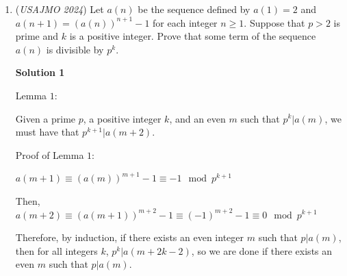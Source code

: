 \begin{enumerate}
            \begin{enumerate}[label=(\roman*)]
                \item 2. Else, if it is \textit{not} vertically symmetric, it makes a pair with its vertical reflection.
            \end{enumerate}
            
            \begin{enumerate}[label=(\roman*)]
                \item 3. Else, if it is \textit{not} half-symmetric, we can similarly make a pair with its horizontal or vertical half-reflection.
            \end{enumerate}
            The \textbf{half-reflection} is defined by reflecting only the edge of each rectangle closest to the horizontal/vertical center, while keeping the other edge fixed. For example, a vertical half-reflection would send the rectangle
 \[\{(0, 0), (1, 0), (1, n-1), (0, n-1)\}\]to
 \[\{(0, 0), (1, 0), (1, n+1), (0, n+1)\}.\]Since every configuration that is not symmetric or half-symmetric comes in pairs, we only need to look at the parity of the configurations that are both symmetric and half-symmetric. But, being symmetric and half-symmetric uniquely determines a rectangle if we know a single vertex, so there is only one such configuration.

 


	\item (\textit{USAJMO 2024}) Let $a(n)$ be the sequence defined by $a(1)=2$ and $a(n+1)=(a(n))^{n+1}-1$ for each integer $n\geq1$. Suppose that $p>2$ is prime and $k$ is a positive integer. Prove that some term of the sequence $a(n)$ is divisible by $p^k$.


 



\textbf{Solution 1}

Lemma $1$:

 Given a prime $p$, a positive integer $k$, and an even $m$ such that $p^k|a(m)$, we must have that $p^{k+1}|a(m+2)$.

 
Proof of Lemma $1$:

 $a(m+1)\equiv (a(m))^{m+1}-1\equiv -1 \mod p^{k+1}$

 Then, $a(m+2)\equiv (a(m+1))^{m+2}-1\equiv (-1)^{m+2}-1\equiv 0 \mod p^{k+1}$

 
Therefore, by induction, if there exists an even integer $m$ such that $p|a(m)$, then for all integers $k$, $p^k|a(m+2k-2)$, so we are done if there exists an even $m$ such that $p|a(m)$.


\end{enumerate}
